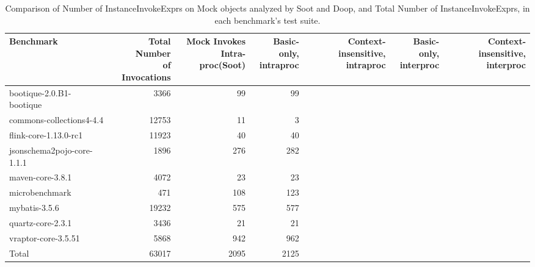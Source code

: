 \begin{table*}
	\centering
	\caption{Comparison of Number of InstanceInvokeExprs on Mock objects analyzed by Soot and Doop, and Total Number of InstanceInvokeExprs, in each benchmark's test suite.}
	\begin{tabular}{lrrrrrr}
		\toprule
		Benchmark & \thead{Total Number \\ of Invocations} & \thead{Mock Invokes \\ Intra-proc(Soot)} & \thead{Basic-only, \\ intraproc} & \thead{Context-insensitive, \\ intraproc} & \thead{Basic-only, \\ interproc} & \thead{Context-insensitive, \\ interproc} \\
		\midrule
		bootique-2.0.B1-bootique           		&  3366     &  99  & 99  &   &   &    \\
		commons-collections4-4.4       			&  12753    &  11  & 3   &   &   &    \\
		flink-core-1.13.0-rc1           		&  11923    &  40  & 40  &   &   &    \\
		jsonschema2pojo-core-1.1.1           	&  1896     &  276  & 282   &   &   &    \\
		maven-core-3.8.1           				&  4072     &  23   & 23    &   &   &    \\
		microbenchmark         		  			&  471      &  108  & 123   &   &   &     \\
		mybatis-3.5.6         		  			&  19232    &  575  & 577   &   &   &       \\
		quartz-core-2.3.1       	  			&  3436     &  21   & 21    &   &   &     \\
		vraptor-core-3.5.51        	  			&  5868     &  942  & 962   &   &   &     \\
		\bottomrule
		Total        	  						&  63017    & 2095  & 2125   &   &   &    \\
	\end{tabular}
	\label{tab:invokes}
\end{table*}

